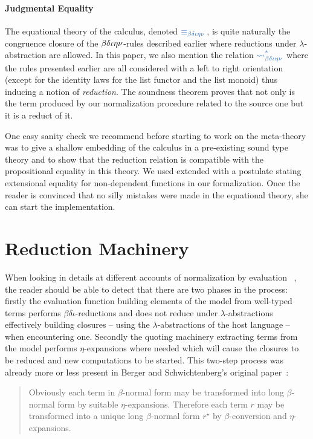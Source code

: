 \documentclass[preprint]{sigplanconf}
\begin{document}
\paragraph{Judgmental Equality} The equational theory of the calculus,
denoted $\conv$, is quite naturally the congruence closure of the
$\operatorname{\beta\delta\iota\eta\nu}$-rules described earlier where reductions under
$\lambda$-abstraction are allowed. In this paper, we also mention
the relation $\reduces$ where the rules presented earlier are all considered with
a left to right orientation (except for the identity laws for the list functor
and the list monoid) thus inducing a notion of \emph{reduction}. The soundness
theorem proves that not only is the term produced by our normalization
procedure related to the source one but it is a reduct of it.

One easy sanity check we recommend before starting to work on the meta-theory was
to give a shallow embedding of the calculus in a pre-existing sound type theory
and to show that the reduction relation is compatible with the propositional
equality in this theory. We used \agda{} extended with a postulate stating
extensional equality for non-dependent functions in our formalization. Once the
reader is convinced that no silly mistakes were made in the equational theory,
she can start the implementation.







\section{Reduction Machinery}
\label{reduction-machinery}

When looking in details at different accounts of normalization by evaluation
~\cite{BerSch91,CoqDyb97,Coquand02,NbeEffects}, the reader should be able to
detect that there are two phases in the process:
firstly the evaluation function building elements of the model from well-typed
terms performs $\beta\delta\iota$-reductions and does not reduce under
$\lambda$-abstractions effectively building closures -- using the $\lambda$-abstractions
of the host language -- when encountering one.
Secondly the quoting machinery extracting terms from the model performs $\eta$-expansions
where needed which will cause the closures to be reduced and new computations to
be started. This two-step process was already more or less present in Berger and
Schwichtenberg's original paper~\cite{BerSch91}:
\begin{quote}Obviously each term in $\beta$-normal form may be transformed into
long $\beta$-normal form by suitable $\eta$-expansions. Therefore each term $r$
may be transformed into a unique long $\beta$-normal form $r^\star$ by
$\beta$-conversion and $\eta$-expansions.
\end{quote}
\end{document}
